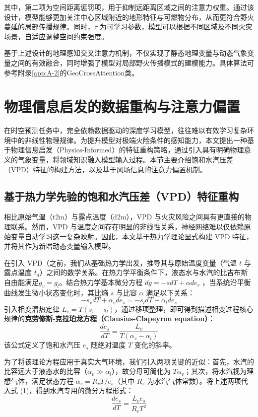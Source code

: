 其中，第二项为空间距离惩罚项，用于抑制远距离区域之间的注意力权重。通过该设计，模型能够更加关注中心区域附近的地形特征与可燃物分布，从而更符合野火蔓延的局部传播规律。同时，$\tau$ 为可学习参数，模型可以根据不同区域及不同火灾场景，自适应调整空间约束强度。

基于上述设计的地理感知交叉注意力机制，不仅实现了静态地理变量与动态气象变量之间的有效融合，同时增强了模型对局部野火传播模式的建模能力。具体算法可参考附录\ref{app:A-2}的GeoCrossAttention类。

\section{物理信息启发的数据重构与注意力偏置}
\label{sec:3-5}
在时空预测任务中，完全依赖数据驱动的深度学习模型，往往难以有效学习复杂环境中的非线性物理规律。为提升模型对极端火险条件的感知能力，本文提出一种基于物理信息启发（Physics-Informed）的特征重构策略，通过引入具有明确物理意义的气象变量，将领域知识融入模型输入过程。本节主要介绍饱和水汽压差（VPD）特征的构建方法，以及基于风场信息的注意力偏置机制。

\subsection{基于热力学先验的饱和水汽压差（VPD）特征重构}
\label{sec:3-5-1}
相比原始气温（t2m）与露点温度（d2m），VPD 与火灾风险之间具有更直接的物理联系。然而，VPD 与温度之间存在明显的非线性关系，神经网络难以仅依赖原始变量自动学习这一复杂映射。因此，本文基于热力学理论显式构建 VPD 特征，并将其作为新增动态变量输入模型。

在引入 VPD（之前，我们从基础热力学出发，推导其与原始温度变量（气温 $t$ 与露点温度 $t_d$）之间的数学关系。在热力学平衡条件下，液态水与水汽的比吉布斯自由能满足$g_v = g_l$。结合热力学基本微分方程 $dg = -s dT + \alpha de_s$ ，当系统沿平衡曲线发生微小状态变化时，其比熵 $s$ 与比容 $\alpha$ 满足以下关系：
\begin{equation}
    -s_v dT + \alpha_v de_s = -s_l dT + \alpha_l de_s
\end{equation}
引入相变潜热定律 $L_v = T(s_v - s_l)$，通过移项整理，即可得到描述相变过程核心规律的\textbf{克劳修斯-克拉珀龙方程（Clausius-Clapeyron equation）}：
\begin{equation}
    \frac{de_s}{dT} = \frac{L_v}{T(\alpha_v - \alpha_l)}
\end{equation}
该公式定义了饱和水汽压 $e_s$ 随绝对温度 $T$ 变化的斜率。

为了将该理论方程应用于真实大气环境，我们引入两项关键的近似：首先，水汽的比容远大于液态水的比容（$\alpha_v \gg \alpha_l$），故分母可简化为 $T \alpha_v$；其次，将水汽视为理想气体，满足状态方程 $\alpha_v = R_v T / e_s$（其中 $R_v$ 为水汽气体常数）。将上述两项代入式 (1)，得到水汽专用的微分方程形式：
\begin{equation}
    \frac{de_s}{dT} = \frac{L_v e_s}{R_v T^2}
\end{equation}

